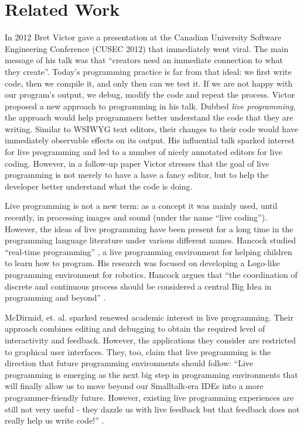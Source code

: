 \section{Related Work}
\label{sec:live}

In 2012 Bret Victor gave a presentation \cite{bretVictorVideo} at the Canadian University Software Engineering Conference (CUSEC 2012) that immediately went viral. The main message of his talk was that ``creators need an immediate connection to what they create''. Today's programming practice is far from that ideal: we first write code, then we compile it, and only then can we test it. If we are not happy with our program's output, we debug, modify the code and repeat the process. Victor proposed a new approach to programming in his talk. Dubbed  {\emph {live programming}}, the approach would help programmers better understand the code that they are writing. Similar to WSIWYG text editors, their changes to their code would have immediately observable effects on its output. His influential talk sparked interest for live programming and led to a number of nicely annotated editors for live coding. However, in a follow-up paper \cite{victor2012} Victor stresses that the goal of live programming is not merely to have a have a fancy editor, but to help the developer better understand what the code is doing.

Live programming is not a new term: as a concept it was mainly used, until recently, in processing images and sound (under the name ``live coding''). However, the ideas of live programming have been present for a long time in the programming language literature under various different names. Hancock studied ``real-time programming'' \cite{HancockPhDThesis}, a live programming environment for helping children to learn how to program. His research was focused on developing a Logo-like programming environment for robotics. Hancock argues that ``the coordination of discrete and continuous process should be considered a central Big Idea in programming and beyond'' \cite{HancockPhDThesis}.

McDirmid, et. al. \cite{McDirmid13oopsla, BurckhardtFHMMTK13_PLDI, McDirmidE14} sparked renewed academic interest in live programming. Their approach combines editing and debugging to obtain the required level of interactivity and  feedback. However, the applications they consider are restricted to graphical user interfaces. They, too, claim that live programming is the direction that  future programming environments should follow: ``Live programming is emerging as the next big step in programming environments that will finally allow us to move beyond our Smalltalk-era IDEs into a more programmer-friendly future. However, existing live programming experiences are still not very useful - they dazzle us with live feedback but that feedback does not really help us write code!'' \cite{McDirmid13oopsla}.

